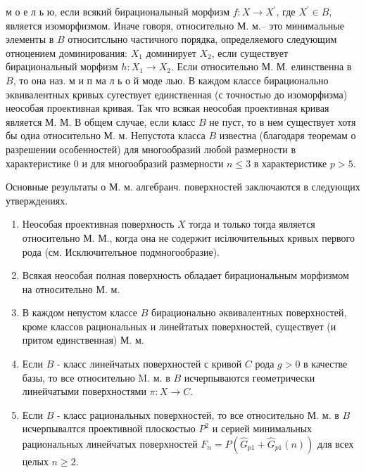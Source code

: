 \documentclass[10pt]{article}
\begin{document}
м о е л ь ю, если всякий бирационалыный морфизм $f: X \rightarrow X^{\prime}$, где $X^{\prime} \in B$, является изоморфизмом. Иначе говоря, относительно М. м.-- это минимальные элементы в $B$ относитслыно частичного порядка, определяемого следующим отноцением доминирования: $X_{1}$ доминирует $X_{2}$, если существует бирациональный морфизм $h: X_{1} \rightarrow X_{2}$. Если относительно М. М. елинственна в $B$, то она наз. м и п ма л ь о й моде лью. В каждом классе бирационально эквивалентных кривых сугествует единственная (с точностью до изоморфизма) неособая проективная кривая. Так что всякая неособая проективная кривая является М. М. В общем случае, если класс $B$ не пуст, то в нем существует хотя бы одиа относительно М. м. Непустота класса $B$ известна (благодаря теоремам о разрешении особенностей) для многообразий любой размерности в характеристике 0 и для многообразий размерности $n \leqslant 3$ в характеристике $p>5$.



Основные результаты о М. м. алгебраич. поверхностей заключаются в следующих утверждениях.



\begin{enumerate}

  \item Неособая проективная поверхность $X$ тогда и только тогда является относительно М. М., когда она не содержит исілючительных кривых первого рода (см. Исключителъное подмногообразие).



  \item Всякая неособая полная поверхность обладает бирациональным морфизмом на относительно М. м.



  \item В каждом непустом классе $B$ бирационально әквивалентных поверхностей, кроме классов рациональных и линейтатых поверхностей, существует (и притом единственная) М. м.



  \item Если $B$ - класс линейчатых поверхностей с кривой $C$ рода $g>0$ в качестве базы, то все относительно M. м. в $B$ исчерпываются геометрически линейчатыми поверхностями $\pi: X \rightarrow C$.



  \item Если $B$ - класс рациональных поверхностей, то все относительно М. м. в $B$ исчерпывалтся проективной плоскостью $P^{2}$ и серией минимальных рациональных линейчатых поверхностей $F_{n}=P\left(\widehat{G}_{p 1}+\widehat{G}_{p 1}(n)\right)$ для всех целых $n \geqslant 2$.



\end{enumerate}
\end{document}
